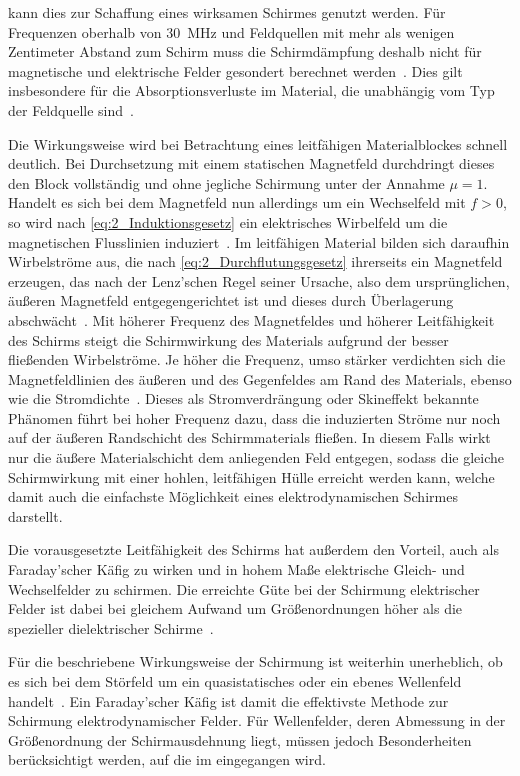 kann dies zur Schaffung eines wirksamen Schirmes genutzt werden. Für Frequenzen oberhalb von \SI{30}{\mega\hertz} und Feldquellen mit mehr als wenigen Zentimeter Abstand zum Schirm muss die Schirmdämpfung deshalb nicht für magnetische und elektrische Felder gesondert berechnet werden~\cite{Design_of_shielded_enclosures}. Dies gilt insbesondere für die Absorptionsverluste im Material, die unabhängig vom Typ der Feldquelle sind~\cite{NASA_SP-3067}.   
\par 
\vspace{\linespace}
Die Wirkungsweise wird bei Betrachtung eines leitfähigen Materialblockes schnell deutlich. Bei Durchsetzung mit einem statischen Magnetfeld durchdringt dieses den Block vollständig und ohne jegliche Schirmung unter der Annahme $\mu = 1$. Handelt es sich bei dem Magnetfeld nun allerdings um ein Wechselfeld mit $f > 0$, so wird nach \Gleichung\eqref{eq:2_Induktionsgesetz} ein elektrisches Wirbelfeld um die magnetischen Flusslinien induziert~\cite{EM_Schirmung}. Im leitfähigen Material bilden sich daraufhin Wirbelströme aus, die nach \Gleichung\eqref{eq:2_Durchflutungsgesetz} ihrerseits ein Magnetfeld erzeugen, das nach der Lenz'schen Regel seiner Ursache, also dem ursprünglichen, äußeren Magnetfeld entgegengerichtet ist und dieses durch Überlagerung abschwächt~\cite{EM_Schirmung}. Mit höherer Frequenz des Magnetfeldes und höherer Leitfähigkeit des Schirms steigt die Schirmwirkung des Materials aufgrund der besser fließenden Wirbelströme. Je höher die Frequenz, umso stärker verdichten sich die Magnetfeldlinien des äußeren und des Gegenfeldes am Rand des Materials, ebenso wie die Stromdichte~\cite{EM_Schirmung}. Dieses als Stromverdrängung oder Skineffekt bekannte Phänomen führt bei hoher Frequenz dazu, dass die induzierten Ströme nur noch auf der äußeren Randschicht des Schirmmaterials fließen. In diesem Falls wirkt nur die äußere Materialschicht dem anliegenden Feld entgegen, sodass die gleiche Schirmwirkung mit einer hohlen, leitfähigen Hülle erreicht werden kann, welche damit auch die einfachste Möglichkeit eines elektrodynamischen Schirmes darstellt. 
\par 
\vspace{\linespace}
Die vorausgesetzte Leitfähigkeit des Schirms hat außerdem den Vorteil, auch als Faraday'scher Käfig zu wirken und in hohem Maße elektrische Gleich- und Wechselfelder zu schirmen. Die erreichte Güte bei der Schirmung elektrischer Felder ist dabei bei gleichem Aufwand um Größenordnungen höher als die spezieller dielektrischer Schirme~\cite{EM_Schirmung}.
\par
\vspace{\linespace}
Für die beschriebene Wirkungsweise der Schirmung ist weiterhin unerheblich, ob es sich bei dem Störfeld um ein quasistatisches oder ein ebenes Wellenfeld handelt~\cite{EM_Schirmung}. Ein Faraday'scher Käfig ist damit die effektivste Methode zur Schirmung elektrodynamischer Felder. Für Wellenfelder, deren Abmessung in der Größenordnung der Schirmausdehnung liegt, müssen jedoch Besonderheiten berücksichtigt werden, auf die im \Abschnitt{} eingegangen wird.  


